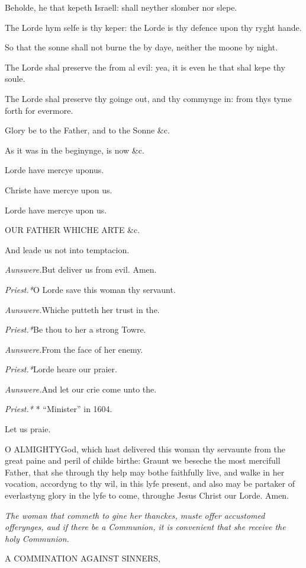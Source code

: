 Beholde, he that kepeth Israell: shall neyther slomber
nor slepe.

The Lorde hym selfe is thy keper: the Lorde is thy
defence upon thy ryght hande.

So that the sonne shall not burne the by daye, neither
the moone by night.

The Lorde shal preserve the from al evil: yea, it is
even he that shal kepe thy soule.

The Lorde shal preserve thy goinge out, and thy commynge
in: from thys tyme forth for evermore.

Glory be to the Father, and to the Sonne \&c.

As it was in the beginynge, is now \&c.

Lorde have mercye upon\emph{}us.

Christe have mercye upon us.

Lorde have mercye upon us.

OUR FATHER WHICHE ARTE
\&c.

And leade us not into temptacion.

\emph{Aunswere.}But deliver us from evil. Amen.

\emph{Priest.*}O Lorde save this woman thy servaunt.

\emph{Aunswere.}Whiche putteth her trust in the.

\emph{Priest.*}Be thou to her a strong Towre.

\emph{Aunswere.}From the face of her enemy.

\emph{Priest.*}Lorde heare our praier.

\emph{Aunswere.}And let our crie come unto the.

\emph{Priest.*} *
``Minister''
in 1604.

Let us praie.

O
ALMIGHTY\textbf{}God, which hast delivered this woman thy servaunte from
the great paine and peril of childe birthe: Graunt we beseche the most
mercifull Father, that she through thy help may bothe faithfully live,
and walke in her vocation, accordyng to thy wil, in this lyfe present,
and also may be partaker of everlastyng glory in the lyfe to come, throughe
Jesus Christ our Lorde. Amen.

\emph{The
woman that commeth to gine her thanckes, muste offer accustomed offerynges,
aud if there be a Communion, it is convenient that she receive the holy
Communion.}

A
COMMINATION AGAINST SINNERS,

